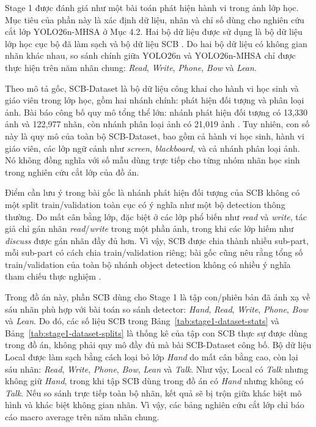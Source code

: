 Stage 1 được đánh giá như một bài toán phát hiện hành vi trong ảnh lớp học. Mục tiêu của phần này là xác định dữ liệu, nhãn và chỉ số dùng cho nghiên cứu cắt lớp YOLO26n-MHSA ở Mục 4.2. Hai bộ dữ liệu được sử dụng là bộ dữ liệu lớp học cục bộ đã làm sạch và bộ dữ liệu SCB \cite{yang2025scbdataset}. Do hai bộ dữ liệu có không gian nhãn khác nhau, so sánh chính giữa YOLO26n và YOLO26n-MHSA chỉ được thực hiện trên năm nhãn chung: \textit{Read}, \textit{Write}, \textit{Phone}, \textit{Bow} và \textit{Lean}.

Theo mô tả gốc, SCB-Dataset là bộ dữ liệu công khai cho hành vi học sinh và giáo viên trong lớp học, gồm hai nhánh chính: phát hiện đối tượng và phân loại ảnh. Bài báo công bố quy mô tổng thể lớn: nhánh phát hiện đối tượng có 13,330 ảnh và 122,977 nhãn, còn nhánh phân loại ảnh có 21,019 ảnh \cite{yang2025scbdataset}. Tuy nhiên, con số này là quy mô của toàn bộ SCB-Dataset, bao gồm cả hành vi học sinh, hành vi giáo viên, các lớp ngữ cảnh như \textit{screen}, \textit{blackboard}, và cả nhánh phân loại ảnh. Nó không đồng nghĩa với số mẫu dùng trực tiếp cho từng nhóm nhãn học sinh trong nghiên cứu cắt lớp của đồ án.

Điểm cần lưu ý trong bài gốc là nhánh phát hiện đối tượng của SCB không có một split train/validation toàn cục có ý nghĩa như một bộ detection thông thường. Do mất cân bằng lớp, đặc biệt ở các lớp phổ biến như \textit{read} và \textit{write}, tác giả chỉ gán nhãn \textit{read}/\textit{write} trong một phần ảnh, trong khi các lớp hiếm như \textit{discuss} được gán nhãn đầy đủ hơn. Vì vậy, SCB được chia thành nhiều sub-part, mỗi sub-part có cách chia train/validation riêng; bài gốc cũng nêu rằng tổng số train/validation của toàn bộ nhánh object detection không có nhiều ý nghĩa tham chiếu thực nghiệm \cite{yang2025scbdataset}.

Trong đồ án này, phần SCB dùng cho Stage 1 là tập con/phiên bản đã ánh xạ về sáu nhãn phù hợp với bài toán so sánh detector: \textit{Hand}, \textit{Read}, \textit{Write}, \textit{Phone}, \textit{Bow} và \textit{Lean}. Do đó, các số liệu SCB trong Bảng~\ref{tab:stage1-dataset-stats} và Bảng~\ref{tab:stage1-dataset-splits} là thống kê của tập con SCB thực sự được dùng trong đồ án, không phải quy mô đầy đủ mà bài SCB-Dataset công bố. Bộ dữ liệu Local được làm sạch bằng cách loại bỏ lớp \textit{Hand} do mất cân bằng cao, còn lại sáu nhãn: \textit{Read}, \textit{Write}, \textit{Phone}, \textit{Bow}, \textit{Lean} và \textit{Talk}. Như vậy, Local có \textit{Talk} nhưng không giữ \textit{Hand}, trong khi tập SCB dùng trong đồ án có \textit{Hand} nhưng không có \textit{Talk}. Nếu so sánh trực tiếp toàn bộ nhãn, kết quả sẽ bị trộn giữa khác biệt mô hình và khác biệt không gian nhãn. Vì vậy, các bảng nghiên cứu cắt lớp chỉ báo cáo macro average trên năm nhãn chung.


